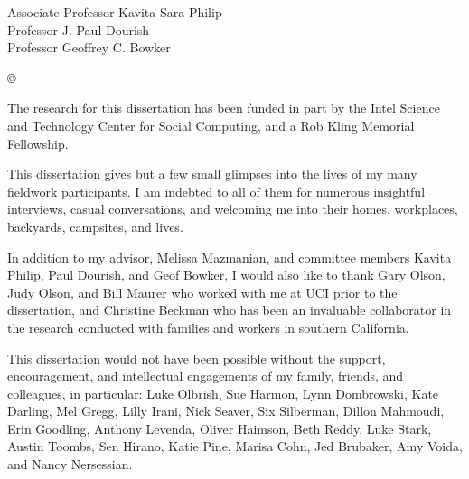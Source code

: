 



\othercommitteemembers
{
  Associate Professor Kavita Sara Philip\\
  Professor J. Paul Dourish\\
  Professor Geoffrey C. Bowker
}


\copyrightdeclaration
{
  © {\Degreeyear} \Authorname
}


%

\acknowledgments
{
The research for this dissertation has been funded in part by the Intel Science and Technology Center for Social Computing, and a Rob Kling Memorial Fellowship. 
	
This dissertation gives but a few small glimpses into the lives of my many fieldwork participants. I am indebted to all of them for numerous insightful interviews, casual conversations, and welcoming me into their homes, workplaces, backyards, campsites, and lives.
  
In addition to my advisor, Melissa Mazmanian, and committee members Kavita Philip, Paul Dourish, and Geof Bowker, I would also like to thank Gary Olson, Judy Olson, and Bill Maurer who worked with me at UCI prior to the dissertation, and Christine Beckman who has been an invaluable collaborator in the research conducted with families and workers in southern California.

This dissertation would not have been possible without the support, encouragement, and intellectual engagements of my family, friends, and colleagues, in particular: Luke Olbrish, Sue Harmon, Lynn Dombrowski, Kate Darling, Mel Gregg, Lilly Irani, Nick Seaver, Six Silberman, Dillon Mahmoudi, Erin Goodling, Anthony Levenda, Oliver Haimson, Beth Reddy, Luke Stark, Austin Toombs, Sen Hirano, Katie Pine, Marisa Cohn, Jed Brubaker, Amy Voida, and Nancy Nersessian.
 }


